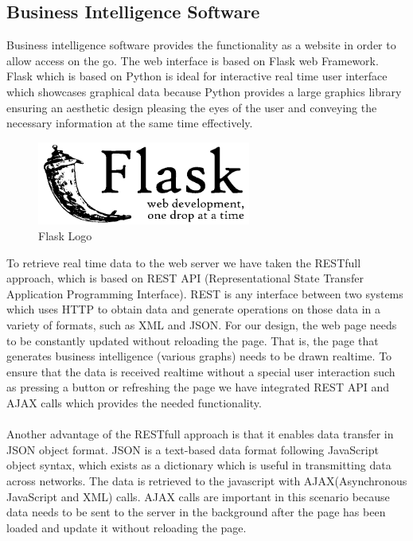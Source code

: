 \documentclass[12pt,a4paper]{report}
\begin{document}
\subsection{Business Intelligence Software}

Business intelligence software provides the functionality as a website in order to allow access on the go. The web interface is based on Flask web Framework. Flask which is based on Python is ideal for interactive real time user interface which showcases graphical data because Python provides a large graphics library ensuring an aesthetic design pleasing the eyes of the user and conveying the necessary information at the same time effectively.

\begin{figure}[H]
\includegraphics[width=7cm]{flask.png}
\centering
\caption{Flask Logo}
\label{flask}
\end{figure}
To retrieve real time data to the web server we have taken the RESTfull approach, which is based on REST API (Representational State Transfer Application Programming Interface). REST is any interface between two systems which uses HTTP to obtain data and generate operations on those data in a variety of formats, such as XML and JSON. For our design, the web page needs to be constantly updated without reloading the page. That is, the page that generates business intelligence (various graphs) needs to be drawn realtime. To ensure that the data is received realtime without a special user interaction such as pressing a button or refreshing the page we have integrated REST API and AJAX calls which provides the needed functionality.\\\\
Another advantage of the RESTfull approach is that it enables data transfer in JSON object format. JSON is a text-based data format following JavaScript object syntax, which exists as a dictionary which is useful in transmitting data across networks. The data is retrieved to the javascript with AJAX(Asynchronous JavaScript and XML) calls. AJAX calls are important in this scenario because data needs to be sent to the server in the background after the page has been loaded and update it without reloading the page.\\\\
\end{document}
